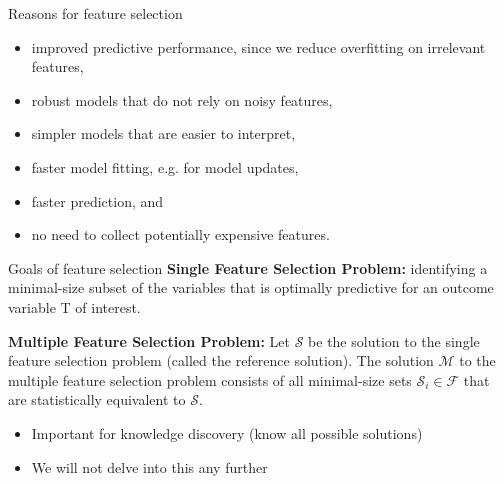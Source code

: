 \documentclass[11pt,compress,t,notes=noshow, xcolor=table]{beamer}
\begin{document}
\begin{frame}{}

\end{frame}

\begin{frame}{}

\end{frame}

\begin{frame}{}

\end{frame}

\begin{frame}{}

\end{frame}

\begin{frame}{Reasons for feature selection}
\begin{itemize}
    \item improved predictive performance, since we reduce overfitting on irrelevant features,
    \item robust models that do not rely on noisy features,
    \item simpler models that are easier to interpret,
    \item faster model fitting, e.g. for model updates,
    \item faster prediction, and
    \item no need to collect potentially expensive features.
\end{itemize}
\end{frame}

\begin{frame}{Goals of feature selection}
\vfill
\textbf{Single Feature Selection Problem:} identifying a minimal-size subset of the variables that is optimally predictive for an outcome variable T of interest.

\vfill

\textbf{Multiple Feature Selection Problem:} Let $\mathcal{S}$ be the solution to the single feature selection problem (called the reference solution). The solution $\mathcal{M}$ to the multiple feature selection problem consists of all minimal-size sets $\mathcal{S}_i \in \mathcal{F}$  that are statistically equivalent to $\mathcal{S}$.
\begin{itemize}
    \item Important for knowledge discovery (know all possible solutions)
    \item We will not delve into this any further
\end{itemize}
\vfill
\end{frame}
\end{document}
